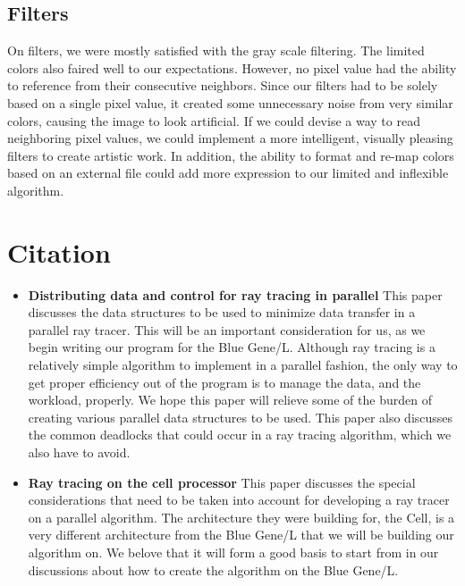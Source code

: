 \documentclass{acmsiggraph}
\begin{document}
\subsection{Filters}
On filters, we were mostly satisfied with the gray scale filtering.  The
limited colors also faired well to our expectations. However, no pixel value had
the ability to reference from their consecutive neighbors.  Since our filters had
to be solely based on a single pixel value, it created some unnecessary noise from
very similar colors, causing the image to look artificial.  If we could devise a
way to read neighboring pixel values, we could implement a more intelligent,
visually pleasing filters to create artistic work.  In addition, the ability
to format and re-map colors based on an external file could add more expression
to our limited and inflexible algorithm.


\section{Citation}

\begin{itemize}
\item
\textbf{Distributing data and control for ray tracing in parallel} This paper
discusses the data structures to be used to minimize data transfer in a parallel
ray tracer. This will be an important consideration for us, as we begin writing
our program for the Blue Gene/L. Although ray tracing is a relatively
simple algorithm to implement in a parallel fashion, the only way to get proper
efficiency out of the program is to manage the data, and the workload, properly.
We hope this paper will relieve some of the burden of creating various parallel
data structures to be used. This paper also discusses the common deadlocks that
could occur in a ray tracing algorithm, which we also have to
avoid.\cite{badouel1994dda}
\item
\textbf{Ray tracing on the cell processor} This paper discusses the special
considerations that need to be taken into account for developing a ray tracer on
a parallel algorithm. The architecture they were building for, the Cell, is a
very different architecture from the Blue Gene/L that we will be building our algorithm
on. We belove that it will form a good basis to start from in our discussions
about how to create the algorithm on the Blue Gene/L.\cite{benthin2006rtc}
\end{itemize}



\end{document}
